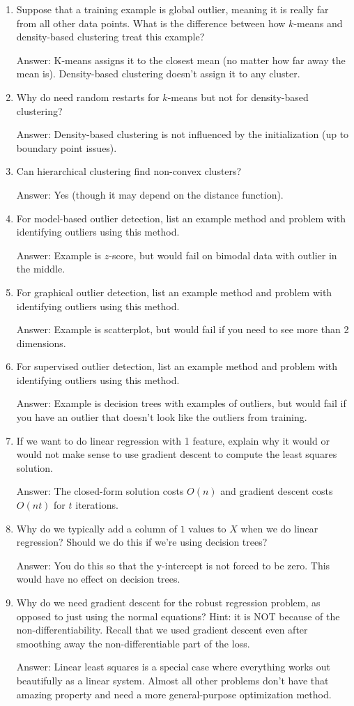 \documentclass{article}
\def\ans#1{\par\gre{Answer: #1}}
\def\blu#1{{\color{blu}#1}}
\def\gre#1{{\color{gre}#1}}
\begin{document}
\blu{
\begin{enumerate}
\item Suppose that a training example is global outlier, meaning it is really far from all other data points. What is the difference between how $k$-means and density-based clustering treat this example?
\ans{K-means assigns it to the closest mean (no matter how far away the mean is). Density-based clustering doesn't assign it to any cluster.}
\item Why do need random restarts for $k$-means but not for density-based clustering?
\ans{Density-based clustering is not influenced by the initialization (up to boundary point issues).}
\item Can hierarchical clustering find non-convex clusters?
\ans{Yes (though it may depend on the distance function).}
\item For model-based outlier detection, list an example method and problem with identifying outliers using this method.
\ans{Example is $z$-score, but would fail on bimodal data with outlier in the middle.}
\item For graphical outlier detection, list an example method and problem with identifying outliers using this method.
\ans{Example is scatterplot, but would fail if you need to see more than 2 dimensions.}
\item For supervised outlier detection, list an example method and problem with identifying outliers using this method.
\ans{Example is decision trees with examples of outliers, but would fail if you have an outlier that doesn't look like the outliers from training.}
\item If we want to do linear regression with 1 feature, explain why it would or would not make sense to use gradient descent to compute the least squares solution.
\ans{The closed-form solution costs $O(n)$ and gradient descent costs $O(nt)$ for $t$ iterations.}
\item Why do we typically add a column of $1$ values to $X$ when we do linear regression? Should we do this if we're using decision trees?
\ans{You do this so that the y-intercept is not forced to be zero. This would have no effect on decision trees.}
\item Why do we need gradient descent for the robust regression problem, as opposed to just using the normal equations? Hint: it is NOT because of the non-differentiability. Recall that we used gradient descent even after smoothing away the non-differentiable part of the loss.
\ans{Linear least squares is a special case where everything works out beautifully as a linear system. Almost all other problems don't have that amazing property and need a more general-purpose optimization method.}

\end{enumerate}}
\end{document}
